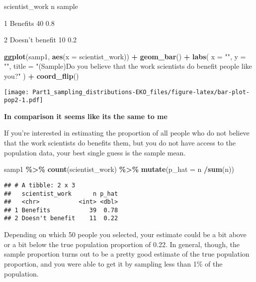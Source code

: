 \documentclass[
]{article}
\newenvironment{Shaded}{\begin{snugshade}}{\end{snugshade}}
\newcommand{\AttributeTok}[1]{\textcolor[rgb]{0.13,0.29,0.53}{#1}}
\newcommand{\FunctionTok}[1]{\textcolor[rgb]{0.13,0.29,0.53}{\textbf{#1}}}
\newcommand{\NormalTok}[1]{#1}
\newcommand{\SpecialCharTok}[1]{\textcolor[rgb]{0.81,0.36,0.00}{\textbf{#1}}}
\newcommand{\StringTok}[1]{\textcolor[rgb]{0.31,0.60,0.02}{#1}}
\begin{document}
scientist\_work n sample

1 Benefits 40 0.8

2 Doesn't benefit 10 0.2

\begin{Shaded}
\begin{Highlighting}[]
\FunctionTok{ggplot}\NormalTok{(samp1, }\FunctionTok{aes}\NormalTok{(}\AttributeTok{x =}\NormalTok{ scientist\_work)) }\SpecialCharTok{+}
  \FunctionTok{geom\_bar}\NormalTok{() }\SpecialCharTok{+}
  \FunctionTok{labs}\NormalTok{(}
    \AttributeTok{x =} \StringTok{""}\NormalTok{, }\AttributeTok{y =} \StringTok{""}\NormalTok{,}
    \AttributeTok{title =} \StringTok{"(Sample)Do you believe that the work scientists do benefit people like you?"}
\NormalTok{  ) }\SpecialCharTok{+}
  \FunctionTok{coord\_flip}\NormalTok{() }
\end{Highlighting}
\end{Shaded}

\texttt{[image: Part1\_sampling\_distributions-EKO\_files/figure-latex/bar-plot-pop2-1.pdf]}

\textbf{In comparison it seems like its the same to me}

If you're interested in estimating the proportion of all people who do
not believe that the work scientists do benefits them, but you do not
have access to the population data, your best single guess is the sample
mean.

\begin{Shaded}
\begin{Highlighting}[]
\NormalTok{samp1 }\SpecialCharTok{\%\textgreater{}\%}
  \FunctionTok{count}\NormalTok{(scientist\_work) }\SpecialCharTok{\%\textgreater{}\%}
  \FunctionTok{mutate}\NormalTok{(}\AttributeTok{p\_hat =}\NormalTok{ n }\SpecialCharTok{/}\FunctionTok{sum}\NormalTok{(n))}
\end{Highlighting}
\end{Shaded}

\begin{verbatim}
## # A tibble: 2 x 3
##   scientist_work      n p_hat
##   <chr>           <int> <dbl>
## 1 Benefits           39  0.78
## 2 Doesn't benefit    11  0.22
\end{verbatim}

Depending on which 50 people you selected, your estimate could be a bit
above or a bit below the true population proportion of 0.22. In general,
though, the sample proportion turns out to be a pretty good estimate of
the true population proportion, and you were able to get it by sampling
less than 1\% of the population.
\end{document}
